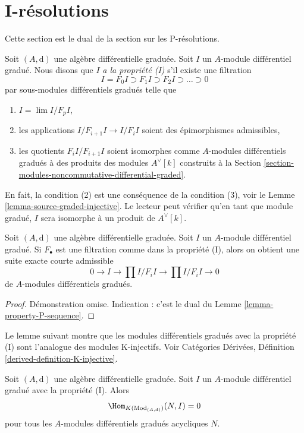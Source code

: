 \section{I-résolutions}
\label{section-I-resolutions}

\noindent
Cette section est le dual de la section sur les P-résolutions.

\medskip\noindent
Soit $(A, \text{d})$ une algèbre différentielle graduée. Soit $I$ un $A$-module
différentiel gradué. Nous disons que $I$ {\it a la propriété (I)} s’il existe une
filtration
$$
I = F_0I \supset F_1I \supset F_2I \supset \ldots \supset 0
$$
par sous-modules différentiels gradués telle que
\begin{enumerate}
\item $I = \lim I/F_pI$,
\item les applications $I/F_{i + 1}I \to I/F_iI$ soient des épimorphismes
admissibles,
\item les quotients $F_iI/F_{i + 1}I$ soient isomorphes comme $A$-modules
différentiels gradués à des produits des modules $A^\vee[k]$ construits à la
Section \ref{section-modules-noncommutative-differential-graded}.
\end{enumerate}
En fait, la condition (2) est une conséquence de la condition (3), voir le Lemme
\ref{lemma-source-graded-injective}. Le lecteur peut vérifier qu’en tant que
module gradué, $I$ sera isomorphe à un produit de $A^\vee[k]$.

\begin{lemma}
\label{lemma-property-I-sequence}
Soit $(A, \text{d})$ une algèbre différentielle graduée. Soit $I$ un $A$-module
différentiel gradué. Si $F_\bullet$ est une filtration comme dans la propriété
(I), alors on obtient une suite exacte courte admissible
$$
0 \to I \to
\prod\nolimits I/F_iI \to
\prod\nolimits I/F_iI \to 0
$$
de $A$-modules différentiels gradués.
\end{lemma}

\begin{proof}
Démonstration omise. Indication : c'est le dual du Lemme \ref{lemma-property-P-sequence}.
\end{proof}

\noindent
Le lemme suivant montre que les modules différentiels gradués avec la propriété
(I) sont l'analogue des modules K-injectifs. Voir Catégories Dérivées, Définition
\ref{derived-definition-K-injective}.

\begin{lemma}
\label{lemma-property-I-K-injective}
Soit $(A, \text{d})$ une algèbre différentielle graduée. Soit $I$ un $A$-module
différentiel gradué avec la propriété (I). Alors
$$
\Hom_{K(\text{Mod}_{(A, \text{d})})}(N, I) = 0
$$
pour tous les $A$-modules différentiels gradués acycliques $N$.
\end{lemma}

